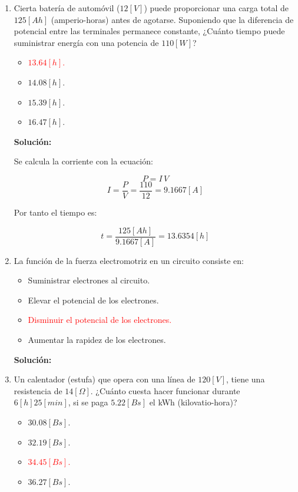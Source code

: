 \documentclass[letter,11pt]{article}
\begin{document}
\begin{enumerate}
\item Cierta batería de automóvil ($12 [V]$) puede proporcionar una carga total
de $125 [Ah]$ (amperio-horas) antes de agotarse. Suponiendo que la diferencia de
potencial entre las terminales permanece constante, ¿Cuánto tiempo puede
suministrar energía con una potencia de $110 [W]$?

\begin{itemize}
    \item \textcolor{red}{$13.64 [h]$.}
    \item $14.08 [h]$.
    \item $15.39 [h]$.
    \item $16.47 [h]$.
\end{itemize}

\textbf{Solución:}

Se calcula la corriente con la ecuación:

\begin{equation*}
    P = I\,V
\end{equation*}
\begin{equation*}
    I = \frac{P}{V} = \frac{110}{12} = 9.1667 [A]
\end{equation*}

Por tanto el tiempo es:

\begin{equation*}
    t = \frac{125 [Ah]}{9.1667 [A]} = 13.6354 [h]
\end{equation*}

\item La función de la fuerza electromotriz en un circuito consiste en:

\begin{itemize}
    \item Suministrar electrones al circuito.
    \item Elevar el potencial de los electrones.
    \item \textcolor{red}{Disminuir el potencial de los electrones.}
    \item Aumentar la rapidez de los electrones.
\end{itemize}

\textbf{Solución:}

\item Un calentador (estufa) que opera con una línea de $120 [V]$, tiene una
resistencia de $14 [\Omega]$. ¿Cuánto cuesta hacer funcionar durante
$6 [h] 25 [min]$, si se paga $5.22 [Bs]$ el kWh (kilovatio-hora)?

\begin{itemize}
    \item $30.08 [Bs]$.
    \item $32.19 [Bs]$.
    \item \textcolor{red}{$34.45 [Bs]$.}
    \item $36.27 [Bs]$.
\end{itemize}


\end{enumerate}
\end{document}

